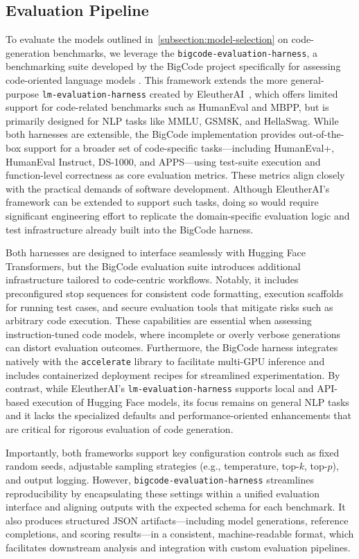 \subsection{Evaluation Pipeline}
\label{sec:pipeline}

To evaluate the models outlined in~\ref{subsection:model-selection} on code-generation benchmarks, we leverage the \texttt{bigcode-evaluation-harness}, a benchmarking suite developed by the BigCode project specifically for assessing code-oriented language models \autocite{Bigcode}. This framework extends the more general-purpose \texttt{lm-evaluation-harness} created by EleutherAI~\autocite{EleutherAI}, which offers limited support for code-related benchmarks such as HumanEval and MBPP, but is primarily designed for \gls{NLP} tasks like MMLU, GSM8K, and HellaSwag. While both harnesses are extensible, the BigCode implementation provides out-of-the-box support for a broader set of code-specific tasks---including HumanEval+, HumanEval Instruct, DS-1000, and APPS---using test-suite execution and function-level correctness as core evaluation metrics. These metrics align closely with the practical demands of software development. Although EleutherAI’s framework can be extended to support such tasks, doing so would require significant engineering effort to replicate the domain-specific evaluation logic and test infrastructure already built into the BigCode harness.

Both harnesses are designed to interface seamlessly with Hugging Face Transformers, but the BigCode evaluation suite introduces additional infrastructure tailored to code-centric workflows. Notably, it includes preconfigured stop sequences for consistent code formatting, execution scaffolds for running test cases, and secure evaluation tools that mitigate risks such as arbitrary code execution. These capabilities are essential when assessing instruction-tuned code models, where incomplete or overly verbose generations can distort evaluation outcomes. Furthermore, the BigCode harness integrates natively with the \texttt{accelerate} library to facilitate multi-GPU inference and includes containerized deployment recipes for streamlined experimentation. By contrast, while EleutherAI’s \texttt{lm-evaluation-harness} supports local and API-based execution of Hugging Face models, its focus remains on general NLP tasks and it lacks the specialized defaults and performance-oriented enhancements that are critical for rigorous evaluation of code generation.

Importantly, both frameworks support key configuration controls such as fixed random seeds, adjustable sampling strategies (e.g., temperature, top-$k$, top-$p$), and output logging. However, \texttt{bigcode-evaluation-harness} streamlines reproducibility by encapsulating these settings within a unified evaluation interface and aligning outputs with the expected schema for each benchmark. It also produces structured JSON artifacts---including model generations, reference completions, and scoring results---in a consistent, machine-readable format, which facilitates downstream analysis and integration with custom evaluation pipelines.

